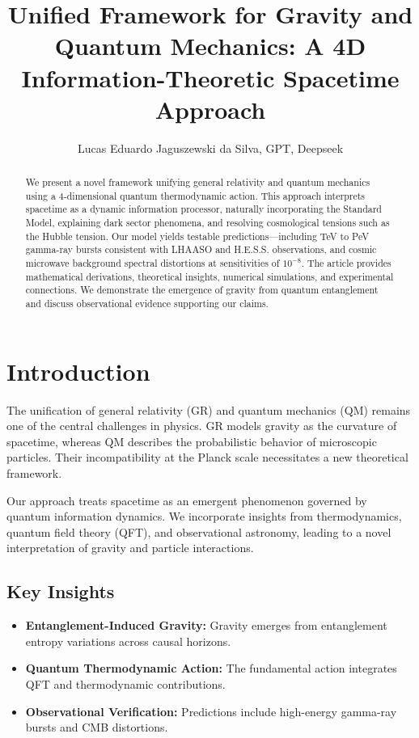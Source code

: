 \documentclass[12pt, a4paper]{article}
\begin{document}
\title{Unified Framework for Gravity and Quantum Mechanics: A 4D Information-Theoretic Spacetime Approach}
\author{Lucas Eduardo Jaguszewski da Silva, GPT, Deepseek}

\begin{abstract}
We present a novel framework unifying general relativity and quantum mechanics using a 4-dimensional quantum thermodynamic action. This approach interprets spacetime as a dynamic information processor, naturally incorporating the Standard Model, explaining dark sector phenomena, and resolving cosmological tensions such as the Hubble tension. Our model yields testable predictions—including TeV to PeV gamma-ray bursts consistent with LHAASO and H.E.S.S. observations, and cosmic microwave background spectral distortions at sensitivities of $10^{-8}$. The article provides mathematical derivations, theoretical insights, numerical simulations, and experimental connections. We demonstrate the emergence of gravity from quantum entanglement and discuss observational evidence supporting our claims.
\end{abstract}

\maketitle

\section{Introduction}
The unification of general relativity (GR) and quantum mechanics (QM) remains one of the central challenges in physics. GR models gravity as the curvature of spacetime, whereas QM describes the probabilistic behavior of microscopic particles. Their incompatibility at the Planck scale necessitates a new theoretical framework.

Our approach treats spacetime as an emergent phenomenon governed by quantum information dynamics. We incorporate insights from thermodynamics, quantum field theory (QFT), and observational astronomy, leading to a novel interpretation of gravity and particle interactions.

\subsection{Key Insights}
\begin{itemize}
    \item \textbf{Entanglement-Induced Gravity:} Gravity emerges from entanglement entropy variations across causal horizons.
    \item \textbf{Quantum Thermodynamic Action:} The fundamental action integrates QFT and thermodynamic contributions.
    \item \textbf{Observational Verification:} Predictions include high-energy gamma-ray bursts and CMB distortions.
\end{itemize}
\end{document}
